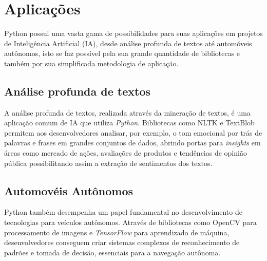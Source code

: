 \chapter{Aplicações}

Python possui uma vasta gama de possibilidades para suas aplicações em projetos de Inteligência Artificial (IA), desde análise profunda de textos até automóveis autônomos, isto se faz possível pela sua grande quantidade de bibliotecas e também por sua simplificada metodologia de aplicação.\cite{didatica2024}

\section{Análise profunda de textos}

A análise profunda de textos, realizada através da mineração de textos, é uma aplicação comum de IA que utiliza \textit{Python}. Bibliotecas como NLTK e TextBlob permitem aos desenvolvedores analisar, por exemplo, o tom emocional por trás de palavras e frases em grandes conjuntos de dados, abrindo portas para \textit{insights} em áreas como mercado de ações, avaliações de produtos e tendências de opinião pública possibilitando assim a extração de sentimentos dos textos.\cite{didatica2024}

\section{Automovéis Autônomos}

Python também desempenha um papel fundamental no desenvolvimento de tecnologias para veículos autônomos. Através de bibliotecas como OpenCV para processamento de imagens e \textit{TensorFlow} para aprendizado de máquina, desenvolvedores conseguem criar sistemas complexos de reconhecimento de padrões e tomada de decisão, essenciais para a navegação autônoma.\cite{didatica2024}